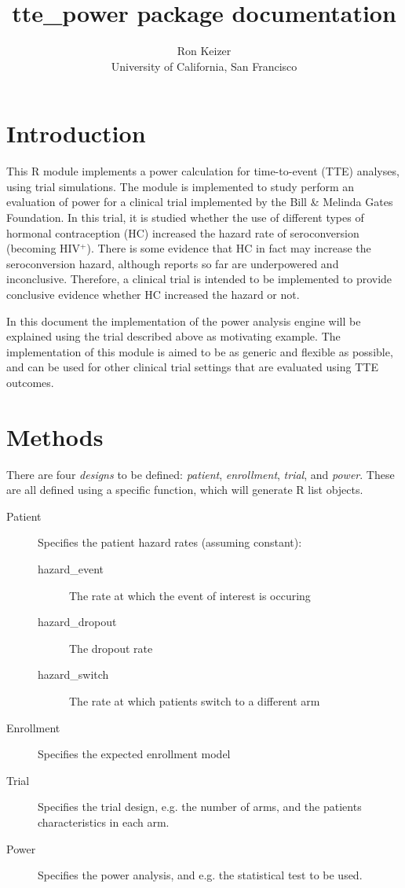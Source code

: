 \documentclass[11pt]{report}
\begin{document}
\title{tte\_power package documentation}
\author{Ron Keizer\\ \small{University of California, San Francisco}}
\maketitle

\section*{Introduction}
This R module implements a power calculation for time-to-event (TTE) analyses, using trial simulations. The module is implemented to study perform an evaluation of power for a clinical trial implemented by the Bill \& Melinda Gates Foundation. In this trial, it is studied whether the use of different types of hormonal contraception (HC) increased the hazard rate of seroconversion (becoming HIV$^+$). There is some evidence that HC in fact may increase the seroconversion hazard, although reports so far are underpowered and inconclusive. Therefore, a clinical trial is intended to be implemented to provide conclusive evidence whether HC increased the hazard or not. 

In this document the implementation of the power analysis engine will be explained using the trial described above as motivating example. The implementation of this module is aimed to be as generic and flexible as possible, and can be used for other clinical trial settings that are evaluated using TTE outcomes.

\section*{Methods}
There are four \textit{designs} to be defined: \textit{patient}, \textit{enrollment}, \textit{trial}, and \textit{power}. These are all defined using a specific function, which will generate R list objects.
\begin{description}
  \item [Patient] Specifies the patient hazard rates (assuming constant):
  \begin{description}
    \item [hazard\_event] The rate at which the event of interest is occuring
    \item [hazard\_dropout] The dropout rate
    \item [hazard\_switch] The rate at which patients switch to a different arm
  \end{description}
  \item [Enrollment] Specifies the expected enrollment model
  \item [Trial] Specifies the trial design, e.g. the number of arms, and the patients characteristics in each arm.
  \item [Power] Specifies the power analysis, and e.g. the statistical test to be used.
\end{description}
\end{document}
